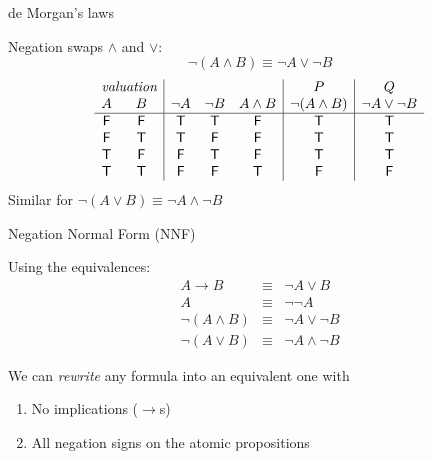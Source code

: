 \documentclass[xetex,aspectratio=169,14pt,hyperref={pdfpagelabels=true,pdflang={en-GB}}]{beamer}
\begin{document}
\begin{frame}
  {de Morgan's laws}

  Negation swaps $\land$ and $\lor$:
  \begin{displaymath}
    \lnot (A \land B) \equiv \lnot A \lor \lnot B
  \end{displaymath}
  \begin{displaymath}
    \begin{array}{cc|ccc|c|c}
      \multicolumn{2}{c|}{\textit{valuation}}&&&&P&Q\\
      A & B & \lnot A & \lnot B & A \land B & \lnot (A \land B) & \lnot A \lor \lnot B \\
      \hline
      \false & \false & \true  & \true  & \false & \true & \true \\
      \false & \true  & \true  & \false & \false & \true & \true \\
      \true  & \false & \false & \true  & \false & \true & \true \\
      \true  & \true  & \false & \false & \true  & \false & \false
    \end{array}
  \end{displaymath}
  Similar for $\lnot (A \lor B) \equiv \lnot A \land \lnot B$
\end{frame}

\begin{frame}
  {Negation Normal Form (NNF)}

  Using the equivalences:
  \begin{displaymath}
    \begin{array}{rcl}
      A \to B & \equiv & \lnot A \lor B \\
      A&\equiv&\lnot \lnot A \\
      \lnot (A \land B)&\equiv&\lnot A \lor \lnot B \\
      \lnot (A \lor B)&\equiv&\lnot A \land \lnot B
    \end{array}
  \end{displaymath}

  We can \emph{rewrite} any formula into an equivalent one with
  \begin{enumerate}
  \item No implications ($\to$s)
  \item All negation signs on the atomic propositions
  \end{enumerate}


\end{frame}
\end{document}
